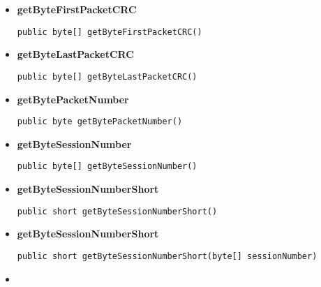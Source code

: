 {{{{{\begin{itemize}
{}%
\item{ 
\hypertarget{filetransferUDP.FileTransfer.getByteFirstPacketCRC()}{{\bf  getByteFirstPacketCRC}\\}
\begin{lstlisting}[frame=none]
public byte[] getByteFirstPacketCRC()\end{lstlisting} %
}%
\item{ 
\hypertarget{filetransferUDP.FileTransfer.getByteLastPacketCRC()}{{\bf  getByteLastPacketCRC}\\}
\begin{lstlisting}[frame=none]
public byte[] getByteLastPacketCRC()\end{lstlisting} %
}%
\item{ 
\hypertarget{filetransferUDP.FileTransfer.getBytePacketNumber()}{{\bf  getBytePacketNumber}\\}
\begin{lstlisting}[frame=none]
public byte getBytePacketNumber()\end{lstlisting} %
}%
\item{ 
\hypertarget{filetransferUDP.FileTransfer.getByteSessionNumber()}{{\bf  getByteSessionNumber}\\}
\begin{lstlisting}[frame=none]
public byte[] getByteSessionNumber()\end{lstlisting} %
}%
\item{ 
\hypertarget{filetransferUDP.FileTransfer.getByteSessionNumberShort()}{{\bf  getByteSessionNumberShort}\\}
\begin{lstlisting}[frame=none]
public short getByteSessionNumberShort()\end{lstlisting} %
}%
\item{ 
\hypertarget{filetransferUDP.FileTransfer.getByteSessionNumberShort(byte[])}{{\bf  getByteSessionNumberShort}\\}
\begin{lstlisting}[frame=none]
public short getByteSessionNumberShort(byte[] sessionNumber)\end{lstlisting} %
}%
\item{ 
}
\end{itemize}}}}}}
